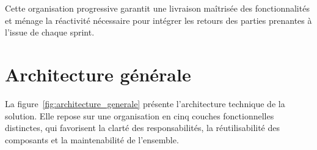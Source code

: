 Cette organisation progressive garantit une livraison maîtrisée
des fonctionnalités et ménage la réactivité nécessaire pour
intégrer les retours des parties prenantes à l'issue de chaque
sprint.

\section{Architecture générale}

La figure~\ref{fig:architecture_generale} présente l'architecture
technique de la solution. Elle repose sur une organisation en cinq
couches fonctionnelles distinctes, qui favorisent la clarté des
responsabilités, la réutilisabilité des composants et la
maintenabilité de l'ensemble.

